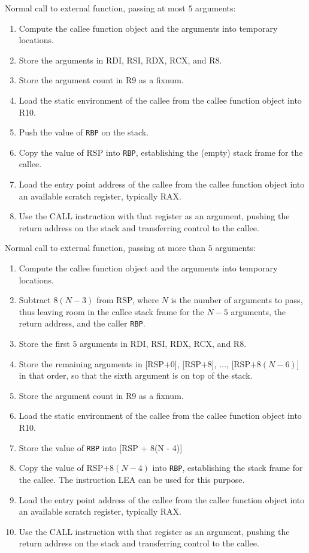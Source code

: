 Normal call to external function, passing at most $5$ arguments:

\begin{enumerate}
\item Compute the callee function object and the arguments into
  temporary locations.
\item Store the arguments in RDI, RSI, RDX, RCX, and R8.
\item Store the argument count in R9 as a fixnum.
\item Load the static environment of the callee from the callee
  function object into R10.
\item Push the value of \texttt{RBP} on the stack.
\item Copy the value of RSP into \texttt{RBP}, establishing the
  (empty) stack frame for the callee.
\item Load the entry point address of the callee from the callee
  function object into an available scratch register, typically RAX.
\item Use the CALL instruction with that register as an argument,
  pushing the return address on the stack and transferring control to
  the callee.
\end{enumerate}

Normal call to external function, passing at more than $5$ arguments:

\begin{enumerate}
\item Compute the callee function object and the arguments into
  temporary locations.
\item Subtract $8(N - 3)$ from RSP, where $N$ is the number of
  arguments to pass, thus leaving room in the callee stack frame for
  the $N - 5$ arguments, the return address, and the caller \texttt{RBP}.
\item Store the first $5$ arguments in RDI, RSI, RDX, RCX, and R8.
\item Store the remaining arguments in [RSP$ + 0$], [RSP$ + 8$],
  $\ldots$, [RSP$ + 8(N - 6)$] in that order, so that the sixth
  argument is on top of the stack.
\item Store the argument count in R9 as a fixnum.
\item Load the static environment of the callee from the callee
  function object into R10.
\item Store the value of \texttt{RBP} into [RSP + 8(N - 4)]
\item Copy the value of RSP$ + 8(N - 4)$ into \texttt{RBP}, establishing the
  stack frame for the callee.  The instruction LEA can be used for
  this purpose.
\item Load the entry point address of the callee from the callee
  function object into an available scratch register, typically RAX.
\item Use the CALL instruction with that register as an argument,
  pushing the return address on the stack and transferring control to
  the callee.
\end{enumerate}

